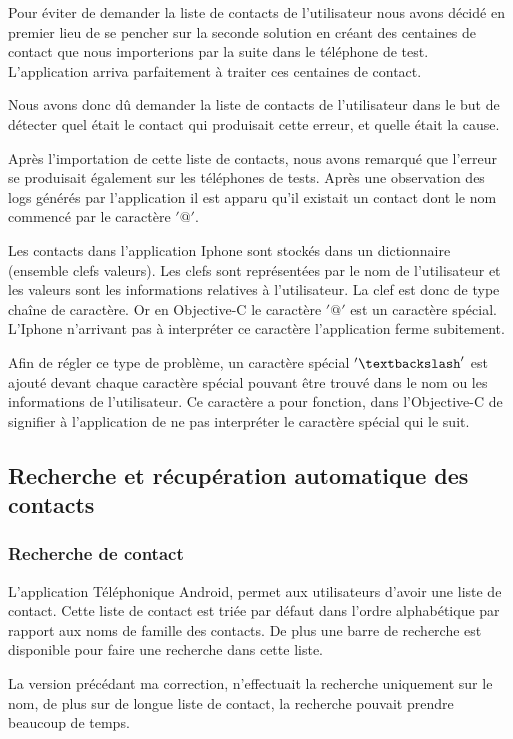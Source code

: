 Pour éviter de demander la liste de contacts de l'utilisateur nous avons décidé en premier lieu de se pencher sur la seconde solution en créant des centaines de contact que nous importerions par la suite dans le téléphone de test. L'application arriva parfaitement à traiter ces centaines de contact.

Nous avons donc dû demander la liste de contacts de l'utilisateur dans le but de détecter quel était le contact qui produisait cette erreur, et quelle était la cause.

Après l'importation de cette liste de contacts, nous avons remarqué que l'erreur se produisait également sur les téléphones de tests. Après une observation des logs générés par l'application il est apparu qu'il existait un contact dont le nom commencé par le caractère $'@'$.

Les contacts dans l'application Iphone sont stockés dans un dictionnaire (ensemble clefs valeurs). Les clefs sont représentées par le nom de l'utilisateur et les valeurs sont les informations relatives à l'utilisateur. La clef est donc de type chaîne de caractère. Or en Objective-C le caractère $'@'$ est un caractère spécial. L'Iphone n'arrivant pas à interpréter ce caractère l'application ferme subitement.

Afin de régler ce type de problème, un caractère spécial $'\textbackslash'$ est ajouté devant chaque caractère spécial pouvant être trouvé dans le nom ou les informations de l'utilisateur. Ce caractère a pour fonction, dans l'Objective-C de signifier à l'application de ne pas interpréter le caractère spécial qui le suit. 

\subsection{Recherche et récupération automatique des contacts}


\subsubsection{Recherche de contact}

L'application Téléphonique Android, permet aux utilisateurs d'avoir une liste de contact. Cette liste de contact est triée par défaut dans l'ordre alphabétique par rapport aux noms de famille des contacts. De plus une barre de recherche est disponible pour faire une recherche dans cette liste.

La version précédant ma correction, n'effectuait la recherche uniquement sur le nom, de plus sur de longue liste de contact, la recherche pouvait prendre beaucoup de temps.

